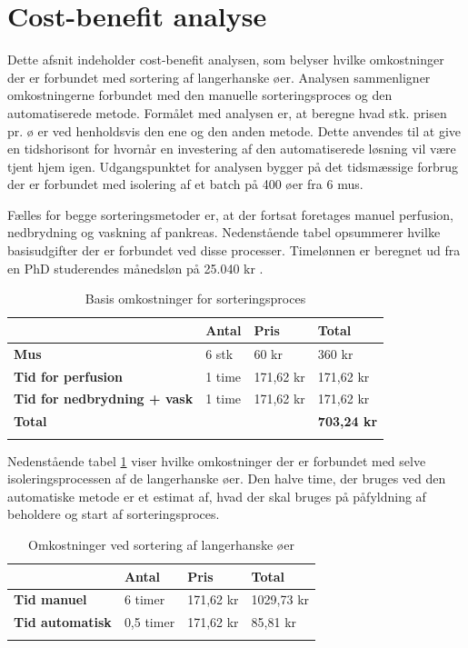 \newpage
\section{Cost-benefit analyse}
Dette afsnit indeholder cost-benefit analysen, som belyser hvilke omkostninger der er forbundet med sortering af langerhanske øer. Analysen sammenligner omkostningerne forbundet med den manuelle sorteringsproces og den automatiserede metode. Formålet med analysen er, at beregne hvad stk. prisen pr. ø er ved henholdsvis den ene og den anden metode. Dette anvendes til at give en tidshorisont for hvornår en investering af den automatiserede løsning vil være tjent hjem igen. Udgangspunktet for analysen bygger på det tidsmæssige forbrug der er forbundet med isolering af et batch på 400 øer fra 6 mus. 

Fælles for begge sorteringsmetoder er, at der fortsat foretages manuel perfusion, nedbrydning og vaskning af pankreas. Nedenstående tabel opsummerer hvilke basisudgifter der er forbundet ved disse processer. Timelønnen er beregnet ud fra en PhD studerendes månedsløn på 25.040 kr \citep{phdwage}.
\begin{center}
		\begin{longtable}{ | m{6cm} | m{1.5cm} | m{1.5cm} | m{3cm}| } 
			\hline
			 &\textbf{Antal} & \textbf{Pris} & \textbf{Total}\\ 
			\hline
			 \textbf{Mus} & 6 stk & 60 kr & 360 kr\\ 
			\hline
			 \textbf{Tid for perfusion} & 1 time & 171,62 kr & 171,62 kr\\ 
			\hline
			\textbf{Tid for nedbrydning + vask} & 1 time & 171,62 kr & 171,62 kr\\ 
			\hline	
			\textbf{Total} &  &  & \textbf{703,24 kr}\\ 
			\hline
			\caption{Basis omkostninger for sorteringsproces}
			 		\end{longtable}
\end{center}
Nedenstående tabel \ref{tab:sortcost} viser hvilke omkostninger der er forbundet med selve isoleringsprocessen af de langerhanske øer. Den halve time, der bruges ved den automatiske metode er et estimat af, hvad der skal bruges på påfyldning af beholdere og start af sorteringsproces. 
\begin{center}
		\begin{longtable}{ | m{6cm} | m{1.5cm} | m{1.5cm} | m{3cm}| } 
			\hline
			 &\textbf{Antal} & \textbf{Pris} & \textbf{Total}\\ 
			\hline
			 \textbf{Tid manuel} & 6 timer & 171,62 kr & 1029,73 kr\\ 
			\hline
			 \textbf{Tid automatisk} & 0,5 timer & 171,62 kr & 85,81 kr\\ 
			\hline
			\caption{Omkostninger ved sortering af langerhanske øer}
			\label{tab:sortcost}
			 		\end{longtable}
\end{center}
